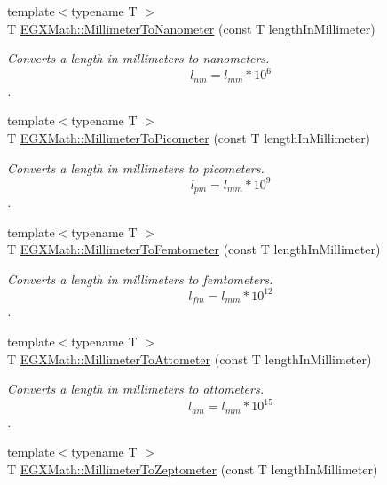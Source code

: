 \begin{DoxyCompactItemize}
{\footnotesize template$<$typename T $>$ }\\T \mbox{\hyperlink{group___e_g_x_math-_conversions-_length_conversions-_s_i-_millimeter-_s_i_ga4ed79a00a348e87b09e55e34d852841c}{E\+G\+X\+Math\+::\+Millimeter\+To\+Nanometer}} (const T length\+In\+Millimeter)
\begin{DoxyCompactList}\small\item\em Converts a length in millimeters to nanometers. \[ l_{nm}=l_{mm} * 10^{6} \]. \end{DoxyCompactList}\item 
{\footnotesize template$<$typename T $>$ }\\T \mbox{\hyperlink{group___e_g_x_math-_conversions-_length_conversions-_s_i-_millimeter-_s_i_ga679e3714c229f1355a5c9bf707fcd723}{E\+G\+X\+Math\+::\+Millimeter\+To\+Picometer}} (const T length\+In\+Millimeter)
\begin{DoxyCompactList}\small\item\em Converts a length in millimeters to picometers. \[ l_{pm}=l_{mm} * 10^{9} \]. \end{DoxyCompactList}\item 
{\footnotesize template$<$typename T $>$ }\\T \mbox{\hyperlink{group___e_g_x_math-_conversions-_length_conversions-_s_i-_millimeter-_s_i_gaa6dd55424b685e10484ca46e394b2e92}{E\+G\+X\+Math\+::\+Millimeter\+To\+Femtometer}} (const T length\+In\+Millimeter)
\begin{DoxyCompactList}\small\item\em Converts a length in millimeters to femtometers. \[ l_{fm}=l_{mm} * 10^{12} \]. \end{DoxyCompactList}\item 
{\footnotesize template$<$typename T $>$ }\\T \mbox{\hyperlink{group___e_g_x_math-_conversions-_length_conversions-_s_i-_millimeter-_s_i_ga4403d88c0af8819b1d6e70057a1457b3}{E\+G\+X\+Math\+::\+Millimeter\+To\+Attometer}} (const T length\+In\+Millimeter)
\begin{DoxyCompactList}\small\item\em Converts a length in millimeters to attometers. \[ l_{am}=l_{mm} * 10^{15} \]. \end{DoxyCompactList}\item 
{\footnotesize template$<$typename T $>$ }\\T \mbox{\hyperlink{group___e_g_x_math-_conversions-_length_conversions-_s_i-_millimeter-_s_i_ga7973ce559c88b84035d9653e26e4464c}{E\+G\+X\+Math\+::\+Millimeter\+To\+Zeptometer}} (const T length\+In\+Millimeter)

\end{DoxyCompactItemize}
